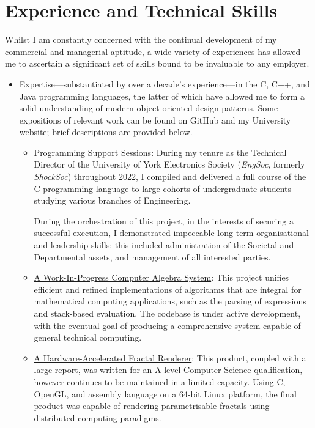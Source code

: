 \documentclass{article}
\newcommand\githublink[2]{\href{https://github.com/oliverdixon/#1}{#2}}
\newcommand\weblink[2]{\href{https://www-users.york.ac.uk/~od641/#1}{#2}}
\begin{document}
\section{Experience and Technical Skills}
Whilst I am constantly concerned with the continual development of my commercial
and managerial aptitude, a wide variety of experiences has allowed me to
ascertain a significant set of skills bound to be invaluable to any employer.
\begin{itemize}
  \item Expertise---substantiated by over a decade's experience---in the C, C++,
  and Java programming languages, the latter of which have allowed me to form a
  solid understanding of modern object-oriented design patterns. Some
  expositions of relevant work can be found on GitHub and my University website;
  brief descriptions are provided below.
  \begin{itemize}
    \item \weblink{pss}{Programming Support Sessions}: During my tenure as the
    Technical Director of the University of York Electronics Society
    (\textit{EngSoc}, formerly \textit{ShockSoc}) throughout 2022, I compiled
    and delivered a full course of the C programming language to large cohorts
    of undergraduate students studying various branches of Engineering.

    During the orchestration of this project, in the interests of securing a
    successful execution, I demonstrated impeccable long-term organisational and
    leadership skills: this included administration of the Societal and
    Departmental assets, and management of all interested parties.

    \item \githublink{calculator-demo}{A Work-In-Progress Computer Algebra
    System}: This project unifies efficient and refined implementations of
    algorithms that are integral for mathematical computing applications, such
    as the parsing of expressions and stack-based evaluation. The codebase is
    under active development, with the eventual goal of producing a
    comprehensive system capable of general technical computing.

    \item \weblink{fractal}{A Hardware-Accelerated Fractal Renderer}: This
    product, coupled with a large report, was written for an A-level Computer
    Science qualification, however continues to be maintained in a limited
    capacity. Using C, OpenGL, and assembly language on a 64-bit Linux platform,
    the final product was capable of rendering parametrisable fractals using
    distributed computing paradigms.


\end{itemize}
\end{itemize}
\end{document}
